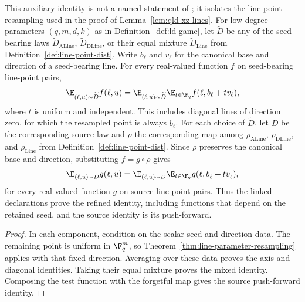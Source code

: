 \begin{corollary}
	\label{cor:line-point-parameter-resampling}
	\leanok
	This auxiliary identity is not a named statement of
	\cite{Ji2020MIPStar}; it isolates the line-point resampling used in the
	proof of Lemma~\ref{lem:qld-xz-lines}. For low-degree parameters
	$(q,m,d,k)$ as in Definition~\ref{def:ld-game}, let $\widetilde D$ be any
	of the seed-bearing laws $\widetilde D_{\mathrm{ALine}}$,
	$\widetilde D_{\mathrm{DLine}}$, or their equal mixture
	$\widetilde D_{\mathrm{Line}}$ from
	Definition~\ref{def:line-point-dist}. Write $b_\ell$ and $v_\ell$ for the
	canonical base and direction of a seed-bearing line. For every real-valued
	function $f$ on seed-bearing line-point pairs,
	\[
		\E_{(\ell,u)\sim \widetilde D} f(\ell,u)
		= \E_{(\ell,u)\sim \widetilde D}\E_{t\in\F_q}
		f(\ell,b_\ell+t v_\ell),
	\]
	where $t$ is uniform and independent. This includes diagonal lines of
	direction zero, for which the resampled point is always $b_\ell$.
	For each choice of $\widetilde D$, let $D$ be the corresponding source law
	and $\rho$ the corresponding map among
	$\rho_{\mathrm{ALine}}$, $\rho_{\mathrm{DLine}}$, and
	$\rho_{\mathrm{Line}}$ from Definition~\ref{def:line-point-dist}. Since
	$\rho$ preserves the canonical base and direction, substituting
	$f=g\circ\rho$ gives
	\[
		\E_{(\bar\ell,u)\sim D} g(\bar\ell,u)
		=\E_{(\bar\ell,u)\sim D}\E_{t\in\F_q}
		g(\bar\ell,b_{\bar\ell}+t v_{\bar\ell}),
	\]
	for every real-valued function $g$ on source line-point pairs. Thus the
	linked declarations prove the refined identity, including functions that
	depend on the retained seed, and the source identity is its push-forward.
\end{corollary}
\begin{proof}
	\leanok
	In each component, condition on the scalar seed and direction data.
	The remaining point is uniform in $\F_q^m$, so
	Theorem~\ref{thm:line-parameter-resampling} applies with that fixed
	direction. Averaging over these data proves the axis and diagonal
	identities. Taking their equal mixture proves the mixed identity. Composing
	the test function with the forgetful map gives the source push-forward
	identity.
\end{proof}

